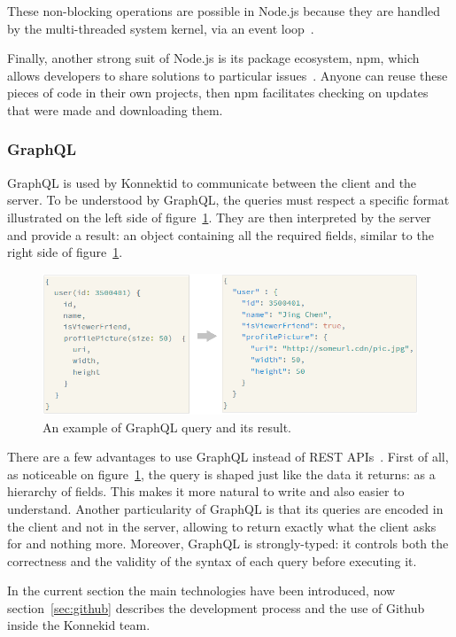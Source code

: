 These non-blocking operations are possible in Node.js because they are handled by the multi-threaded system kernel, via an event loop~\cite{eventLoop}.

Finally, another strong suit of Node.js is its package ecosystem, npm, which allows developers to share solutions to particular issues~\cite{npm}. Anyone can reuse these pieces of code in their own projects, then npm facilitates checking on updates that were made and downloading them.

\subsubsection{GraphQL}
\label{sssec:grqphql}

GraphQL is used by Konnektid to communicate between the client and the server. To be understood by GraphQL, the queries must respect a specific format illustrated on the left side of {\sc figure}~\ref{fig:query}. They are then interpreted by the server and provide a result: an object containing all the required fields, similar to the right side of {\sc figure}~\ref{fig:query}.

\begin{figure}[H]
    \centering
    \includegraphics[scale=0.8]{figure/query.png}
    \caption{An example of GraphQL query and its result.}
    \label{fig:query}
\end{figure}

There are a few advantages to use GraphQL instead of REST APIs~\cite{graphQL}. First of all, as noticeable on {\sc figure}~\ref{fig:query}, the query is shaped just like the data it returns: as a hierarchy of fields. This makes it more natural to write and also easier to understand. Another particularity of GraphQL is that its queries are encoded in the client and not in the server, allowing to return exactly what the client asks for and nothing more. Moreover, GraphQL is strongly-typed: it controls both the correctness and the validity of the syntax of each query before executing it. 

In the current section the main technologies have been introduced, now {\sc section}~\ref{sec:github} describes the development process and the use of Github inside the Konnekid team.
